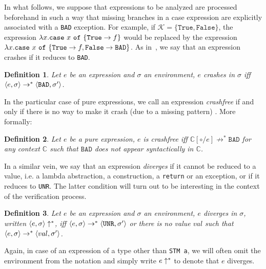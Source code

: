 \documentclass[submission,copyright,creativecommons]{eptcs}
\newcommand{\code}[1]{\textrm{{\tt #1}}}
\newcommand{\caseof}[2]{\code{case} \ #1 \ \code{of} \ #2 }
\def\evalcont{\mathbb{C}}
\def\evalcont{\mathbb{C}}
\newtheorem{definition}{Definition}
\begin{document}
In what follows, we suppose that expressions to be analyzed are processed beforehand in such a way that missing branches in a case expression are explicitly associated with a \texttt{BAD} exception. For example, if $\mathcal{K} = \{ \mathtt{True}, \mathtt{False} \}$, the expression $\lambda x. \caseof{x}{\{\mathtt{True} -> f\}}$ would be replaced by the expression $\lambda x. \caseof{x}{\{\mathtt{True} -> f, \mathtt{False} -> \mathtt{BAD}\}}$. As in~\cite{static-contract-checking}, we say that an expression crashes if it reduces to \texttt{BAD}.

\begin{definition}
  Let $e$ be an expression and $\sigma$ an environment, $e$ \emph{crashes} in $\sigma$ iff $\langle e,\sigma \rangle \rightarrow^{*} \langle \mathtt{BAD},\sigma' \rangle$.
\end{definition}

In the particular case of pure expressions, 
we call an expression \emph{crashfree} if and only if there is no way to make it crash (due to a missing pattern) \cite{static-contract-checking}. More formally:
\begin{definition}
  Let $e$ be a pure expression, $e$ is \emph{crashfree} iff $\evalcont[\circ / e] \not\rightarrow^{*} \mathtt{BAD}$ for any context $\evalcont$ such that $\mathtt{BAD}$ does not appear syntactically in $\evalcont$.
\end{definition}



In a similar vein, we say that an expression \textit{diverges} if it cannot be reduced to a value, i.e. a lambda abstraction, a construction, a \texttt{return} or an exception, or if it reduces to \texttt{UNR}. The latter condition will turn out to be interesting in the context of the verification process.

\begin{definition}
  Let $e$ be an expression and $\sigma$ an environment, $e$ \emph{diverges} in $\sigma$, written $\langle e,\sigma \rangle\uparrow^{*}$, iff $\langle e,\sigma \rangle \rightarrow^{*} \langle \mathtt{UNR},\sigma' \rangle  $ or there is no value $val$ such that $\langle e,\sigma \rangle \rightarrow^{*} \langle val,\sigma' \rangle$.
\end{definition}

Again, in case of an expression of a type other than \texttt{STM a}, we will often omit the environment from the notation and simply write $e\uparrow^{*}$ to denote that $e$ diverges.


 
\end{document}
